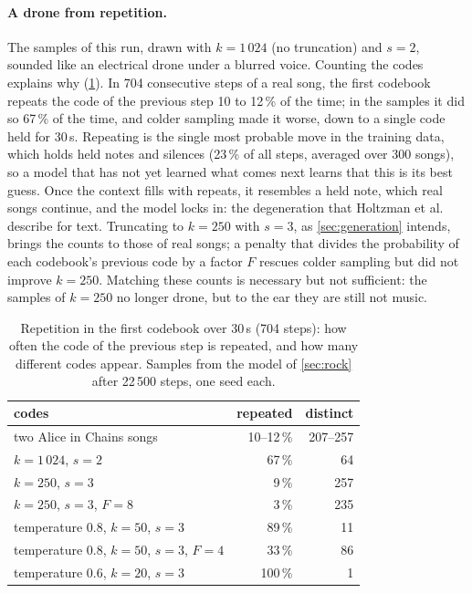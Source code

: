 \paragraph{A drone from repetition.} The samples of this run, drawn with
$k = 1\,024$ (no truncation) and $s = 2$, sounded like an electrical drone
under a blurred voice. Counting the codes explains why
(\cref{tab:repetition}). In 704 consecutive steps of a real song, the first
codebook repeats the code of the previous step 10 to 12\,\% of the time; in
the samples it did so 67\,\% of the time, and colder sampling made it worse,
down to a single code held for 30\,s. Repeating is the single most probable
move in the training data, which holds held notes and silences (23\,\% of all
steps, averaged over 300 songs), so a model that has not yet learned what
comes next learns that this is its best guess. Once the context fills with
repeats, it resembles a held note, which real songs continue, and the model
locks in: the degeneration that Holtzman et al.\ \cite{holtzman2020curious}
describe for text. Truncating to $k = 250$ with $s = 3$, as \cref{sec:generation} intends,
brings the counts to those of real songs; a penalty that divides the
probability of each codebook's previous code by a factor $F$
\cite{keskar2019ctrl} rescues colder sampling but did not improve $k = 250$.
Matching these counts is necessary but not sufficient: the samples of
$k = 250$ no longer drone, but to the ear they are still not music.

\begin{table}[htbp]
\centering
\caption{Repetition in the first codebook over 30\,s (704 steps): how often
the code of the previous step is repeated, and how many different codes
appear. Samples from the model of \cref{sec:rock} after 22\,500 steps, one
seed each.}
\label{tab:repetition}
\footnotesize
\begin{tabular}{lrr}
\toprule
codes & repeated & distinct \\
\midrule
two Alice in Chains songs & 10--12\,\% & 207--257 \\
$k = 1\,024$, $s = 2$ & 67\,\% & 64 \\
$k = 250$, $s = 3$ & 9\,\% & 257 \\
$k = 250$, $s = 3$, $F = 8$ & 3\,\% & 235 \\
temperature 0.8, $k = 50$, $s = 3$ & 89\,\% & 11 \\
temperature 0.8, $k = 50$, $s = 3$, $F = 4$ & 33\,\% & 86 \\
temperature 0.6, $k = 20$, $s = 3$ & 100\,\% & 1 \\
\bottomrule
\end{tabular}
\end{table}

